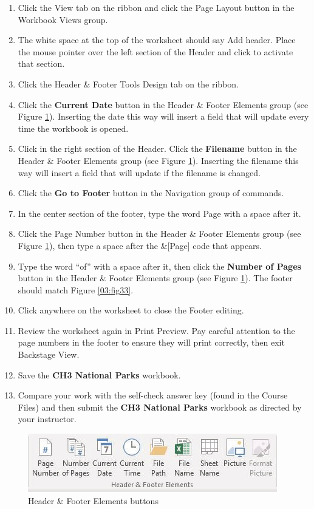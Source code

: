 \begin{enumerate}
	\item Click the View tab on the ribbon and click the Page Layout button in the Workbook Views group.
	\item The white space at the top of the worksheet should say Add header. Place the mouse pointer over the left section of the Header and click to activate that section.
	\item Click the Header \& Footer Tools Design tab on the ribbon.
	\item Click the \textbf{Current Date} button in the Header \& Footer Elements group (see Figure \ref{03:fig32}). Inserting the date this way will insert a field that will update every time the workbook is opened.
	\item Click in the right section of the Header. Click the \textbf{Filename} button in the Header \& Footer Elements group (see Figure \ref{03:fig32}). Inserting the filename this way will insert a field that will update if the filename is changed.
	\item Click the \textbf{Go to Footer} button in the Navigation group of commands.
	\item In the center section of the footer, type the word Page with a space after it.
	\item Click the Page Number button in the Header \& Footer Elements group (see Figure \ref{03:fig32}), then type a space after the \&[Page] code that appears.
	\item Type the word ``of'' with a space after it, then click the \textbf{Number of Pages} button in the Header \& Footer Elements group (see Figure \ref{03:fig32}). The footer should match Figure \ref{03:fig33}.
	\item Click anywhere on the worksheet to close the Footer editing.
	\item Review the worksheet again in Print Preview. Pay careful attention to the page numbers in the footer to ensure they will print correctly, then exit Backstage View.
	\item Save the \textbf{CH3 National Parks} workbook.
	\item Compare your work with the self-check answer key (found in the Course Files) and then submit the \textbf{CH3 National Parks} workbook as directed by your instructor.
\end{enumerate}

\begin{figure}[H]
	\centering
	\includegraphics[width=\maxwidth{.95\linewidth}]{gfx/ch03_fig32}
	\caption{Header \& Footer Elements buttons}
	\label{03:fig32}
\end{figure}

